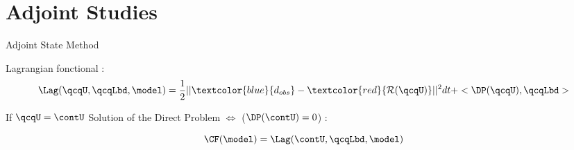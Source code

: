 \section{Adjoint Studies}
\renewcommand\tikzscale{1.3}



\begin{frame}{Adjoint State Method}

Lagrangian fonctional :
  \begin{equation}
    \Lag(\qcqU,\qcqLbd,\model) = \frac{1}{2}||\textcolor{blue}{d_{obs}}-\textcolor{red}{\mathcal{R}(\qcqU)}||^2dt + <\DP(\qcqU),\qcqLbd>
  \end{equation}

    If $\qcqU=\contU$ Solution of the Direct Problem $\Longleftrightarrow$ ($\DP(\contU) = 0$) :

  \begin{equation}
    \CF(\model) = \Lag(\contU,\qcqLbd,\model)
  \end{equation}



\end{frame}



















